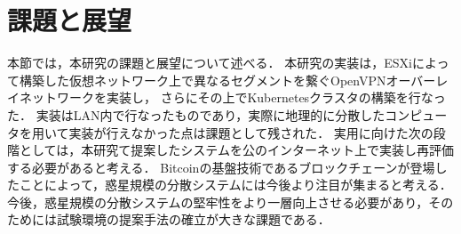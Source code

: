 \section{課題と展望}
\label{conclusion:issue}

本節では，本研究の課題と展望について述べる．
本研究の実装は，ESXiによって構築した仮想ネットワーク上で異なるセグメントを繋ぐOpenVPNオーバーレイネットワークを実装し，
さらにその上でKubernetesクラスタの構築を行なった．
実装はLAN内で行なったものであり，実際に地理的に分散したコンピュータを用いて実装が行えなかった点は課題として残された．
実用に向けた次の段階としては，本研究て提案したシステムを公のインターネット上で実装し再評価する必要があると考える．
Bitcoinの基盤技術であるブロックチェーンが登場したことによって，惑星規模の分散システムには今後より注目が集まると考える．
今後，惑星規模の分散システムの堅牢性をより一層向上させる必要があり，そのためには試験環境の提案手法の確立が大きな課題である．

